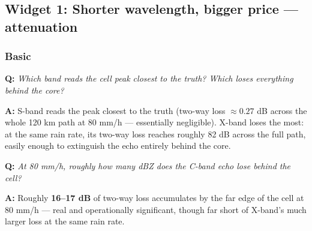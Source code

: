 \documentclass[11pt]{article}
\newenvironment{qa}[1]{\par\noindent\textbf{\color{qgray}Q: }\emph{#1}\par\noindent\textbf{A: }}{\par\vspace{6pt}}
\newcommand{\tier}[1]{\subsubsection*{#1}}
\begin{document}
\subsection{Widget 1: Shorter wavelength, bigger price --- attenuation}

\tier{Basic}
\begin{qa}{Which band reads the cell peak closest to the truth? Which loses everything behind the core?}
S-band reads the peak closest to the truth (two-way loss $\approx0.27$ dB across the whole 120 km path at 80 mm/h --- essentially negligible). X-band loses the most: at the same rain rate, its two-way loss reaches roughly 82 dB across the full path, easily enough to extinguish the echo entirely behind the core.
\end{qa}
\begin{qa}{At 80 mm/h, roughly how many dBZ does the C-band echo lose behind the cell?}
Roughly \textbf{16--17 dB} of two-way loss accumulates by the far edge of the cell at 80 mm/h --- real and operationally significant, though far short of X-band's much larger loss at the same rain rate.
\end{qa}
\end{document}
